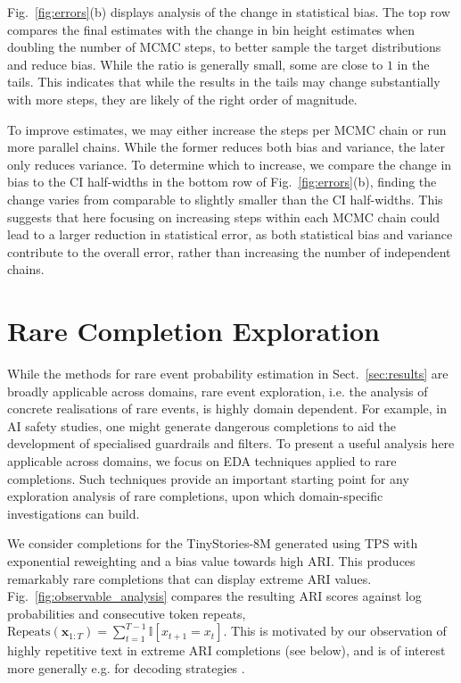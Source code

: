 \documentclass{article}
\newcommand{\realtraj}{\mathbf{x}}
\newcommand{\realtoken}{x}
\newcommand{\Indf}{\mathbb I}
\begin{document}
Fig.~\ref{fig:errors}(b) displays analysis of the change in statistical bias. The top row compares the final estimates with the change in bin height estimates when doubling the number of MCMC steps, to better sample the target distributions and reduce bias. While the ratio is generally small, some are close to $1$ in the tails. This indicates that while the results in the tails may change substantially with more steps, they are likely of the right order of magnitude.

To improve estimates, we may either increase the steps per MCMC chain or run more parallel chains. While the former reduces both bias and variance, the later only reduces variance.
To determine which to increase, we compare the change in bias to the CI half-widths in the bottom row of Fig.~\ref{fig:errors}(b), finding the change varies from comparable to slightly smaller than the CI half-widths.
This suggests that here focusing on increasing steps within each MCMC chain could lead to a larger reduction in statistical error, as both statistical bias and variance contribute to the overall error, rather than increasing the number of independent chains.

\section{Rare Completion Exploration}
\label{sec:analysis}


While the methods for rare event probability estimation in Sect.~\ref{sec:results} are broadly applicable across domains, rare event exploration, i.e. the analysis of concrete realisations of rare events, is highly domain dependent. For example, in AI safety studies, one might generate dangerous completions to aid the development of specialised guardrails and filters. To present a useful analysis here applicable across domains, we focus on EDA techniques applied to rare completions. Such techniques provide an important starting point for any exploration analysis of rare completions, upon which domain-specific investigations can build.

We consider completions for the TinyStories-8M  generated using TPS with exponential reweighting and a bias value towards high ARI. This produces remarkably rare completions that can display extreme ARI values. Fig.~\ref{fig:observable_analysis} compares the resulting
ARI scores against log probabilities and consecutive token repeats, $\text{Repeats}(\realtraj_{1:T}) = \sum_{t=1}^{T-1} \Indf[\realtoken_{t+1} = x_t]$. This is motivated by our observation of highly repetitive text in extreme ARI completions (see below), and is of interest more generally e.g. for decoding strategies \cite{holtzman2020the-curious}.
\end{document}
